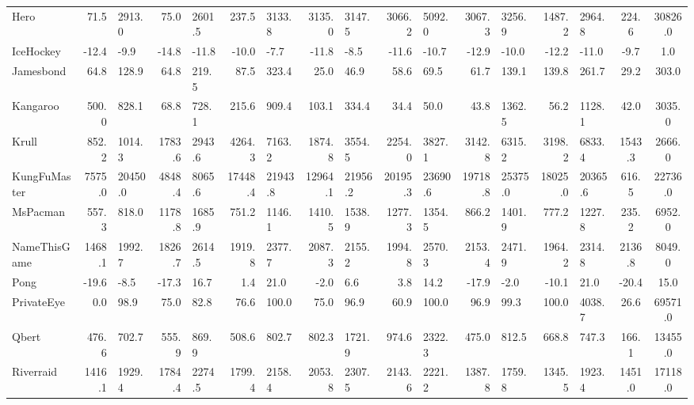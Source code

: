 \begin{landscape}
\begin{changemargin}{0cm}{0cm}
\begin{center}
\begin{table}[!htbp]
\begin{tabular}{l|rl|rl|rl|rl|rl|rl|rl|c|c}
Hero           &     71.5 &   2913.0 &     75.0 &   2601.5 &    237.5 &   3133.8 &   3135.0 &   3147.5 &   3066.2 &   5092.0 &   3067.3 &   3256.9 &   1487.2 &   2964.8 &    224.6 &  30826.0 \\
IceHockey      &    -12.4 &     -9.9 &    -14.8 &    -11.8 &    -10.0 &     -7.7 &    -11.8 &     -8.5 &    -11.6 &    -10.7 &    -12.9 &    -10.0 &    -12.2 &    -11.0 &     -9.7 &      1.0 \\
Jamesbond      &     64.8 &    128.9 &     64.8 &    219.5 &     87.5 &    323.4 &     25.0 &     46.9 &     58.6 &     69.5 &     61.7 &    139.1 &    139.8 &    261.7 &     29.2 &    303.0 \\
Kangaroo       &    500.0 &    828.1 &     68.8 &    728.1 &    215.6 &    909.4 &    103.1 &    334.4 &     34.4 &     50.0 &     43.8 &   1362.5 &     56.2 &   1128.1 &     42.0 &   3035.0 \\
Krull          &    852.2 &   1014.3 &   1783.6 &   2943.6 &   4264.3 &   7163.2 &   1874.8 &   3554.5 &   2254.0 &   3827.1 &   3142.8 &   6315.2 &   3198.2 &   6833.4 &   1543.3 &   2666.0 \\
KungFuMaster   &   7575.0 &  20450.0 &   4848.4 &   8065.6 &  17448.4 &  21943.8 &  12964.1 &  21956.2 &  20195.3 &  23690.6 &  19718.8 &  25375.0 &  18025.0 &  20365.6 &    616.5 &  22736.0 \\
MsPacman       &    557.3 &    818.0 &   1178.8 &   1685.9 &    751.2 &   1146.1 &   1410.5 &   1538.9 &   1277.3 &   1354.5 &    866.2 &   1401.9 &    777.2 &   1227.8 &    235.2 &   6952.0 \\
NameThisGame   &   1468.1 &   1992.7 &   1826.7 &   2614.5 &   1919.8 &   2377.7 &   2087.3 &   2155.2 &   1994.8 &   2570.3 &   2153.4 &   2471.9 &   1964.2 &   2314.8 &   2136.8 &   8049.0 \\
Pong           &    -19.6 &     -8.5 &    -17.3 &     16.7 &      1.4 &     21.0 &     -2.0 &      6.6 &      3.8 &     14.2 &    -17.9 &     -2.0 &    -10.1 &     21.0 &    -20.4 &     15.0 \\
PrivateEye     &      0.0 &     98.9 &     75.0 &     82.8 &     76.6 &    100.0 &     75.0 &     96.9 &     60.9 &    100.0 &     96.9 &     99.3 &    100.0 &   4038.7 &     26.6 &  69571.0 \\
Qbert          &    476.6 &    702.7 &    555.9 &    869.9 &    508.6 &    802.7 &    802.3 &   1721.9 &    974.6 &   2322.3 &    475.0 &    812.5 &    668.8 &    747.3 &    166.1 &  13455.0 \\
Riverraid      &   1416.1 &   1929.4 &   1784.4 &   2274.5 &   1799.4 &   2158.4 &   2053.8 &   2307.5 &   2143.6 &   2221.2 &   1387.8 &   1759.8 &   1345.5 &   1923.4 &   1451.0 &  17118.0 \\

\end{tabular}
\end{table}
\end{center}
\end{changemargin}
\end{landscape}
